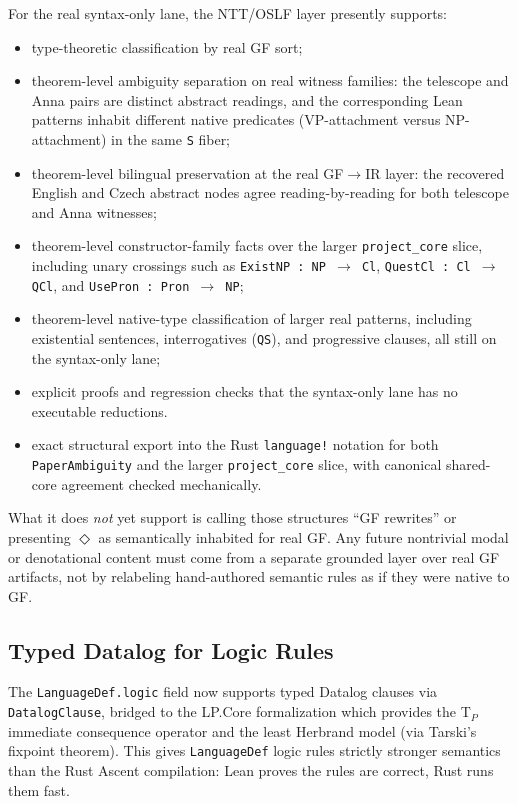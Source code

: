 \documentclass[]{article}
\newcommand{\code}[1]{\texttt{#1}}
\begin{document}
For the real syntax-only lane, the NTT/OSLF layer presently supports:
\begin{itemize}
\item type-theoretic classification by real GF sort;
\item theorem-level ambiguity separation on real witness families:
  the telescope and Anna pairs are distinct abstract readings, and the
  corresponding Lean patterns inhabit different native predicates
  (VP-attachment versus NP-attachment) in the same \code{S} fiber;
\item theorem-level bilingual preservation at the real GF$\to$IR layer:
  the recovered English and Czech abstract nodes agree reading-by-reading
  for both telescope and Anna witnesses;
\item theorem-level constructor-family facts over the larger
  \code{project\_core} slice, including unary crossings such as
  \code{ExistNP : NP $\to$ Cl}, \code{QuestCl : Cl $\to$ QCl}, and
  \code{UsePron : Pron $\to$ NP};
\item theorem-level native-type classification of larger real patterns,
  including existential sentences, interrogatives (\code{QS}), and
  progressive clauses, all still on the syntax-only lane;
\item explicit proofs and regression checks that the syntax-only lane
  has no executable reductions.
\item exact structural export into the Rust \code{language!} notation for both
  \code{PaperAmbiguity} and the larger \code{project\_core} slice, with
  canonical shared-core agreement checked mechanically.
\end{itemize}

What it does \emph{not} yet support is calling those structures
``GF rewrites'' or presenting $\Diamond$ as semantically inhabited for
real GF.  Any future nontrivial modal or denotational content must come
from a separate grounded layer over real GF artifacts, not by
relabeling hand-authored semantic rules as if they were native to GF.

\subsection{Typed Datalog for Logic Rules}

The \code{LanguageDef.logic} field now supports typed Datalog clauses
via \code{DatalogClause}, bridged to the LP.Core formalization which
provides the T$_P$ immediate consequence operator and the least
Herbrand model (via Tarski's fixpoint theorem).  This gives
\code{LanguageDef} logic rules strictly stronger semantics than the
Rust Ascent compilation: Lean proves the rules are correct, Rust
runs them fast.
\end{document}

